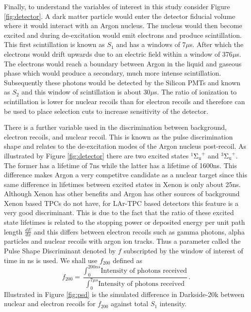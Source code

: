 \documentclass[11pt]{article} %
\begin{document}
\par Finally, to understand the variables of interest in this study consider Figure \ref{fig:detector}.
A dark matter particle would enter the detector fiducial volume where it would interact with an Argon nucleus.
The nucleus would then become excited and during de-excitation would emit electrons and produce scintillation.
This first scintillation is known as $S_1$ and has a windows of 7$\mu$s.
After which the electrons would drift upwards due to an electric field within a window of 376$\mu$s.
The electrons would reach a boundary between Argon in the liquid and gaseous phase which would produce a secondary, much more intense scintillation.
Subsequently these photons would be detected by the Silicon PMTs and known as $S_2$ and this window of scintillation is about 30$\mu$s.
The ratio of ionization to scintillation is lower for nuclear recoils than for electron recoils and therefore can be used to place selection cuts to increase sensitivity of the detector.
\\
\par There is a further variable used in the discrimination between background, electron recoils, and nuclear recoil.
This is known as the pulse discrimination shape and relates to the de-excitation modes of the Argon nucleus post-recoil.
As illustrated by Figure \ref{fig:detector} there are two excited states $^{1}\mathrm{{\Sigma_{u}}^{+}}$ and $^{3}\mathrm{{\Sigma_{u}}^{+}}$.
The former has a lifetime of 7ns while the latter has a lifetime of 1600ns.
This difference makes Argon a very competitve candidate as a nuclear target since this same difference in lifetimes between
excited states in Xenon is only about 25ns.
Although Xenon has other benefits and Argon has other sources of background Xenon based TPCs do not have, for LAr-TPC based
detectors this feature is a very good discriminant.
This is due to the fact that the ratio of these excited state lifetimes is related to the stopping power or deposited energy per unit path length
$\frac{dE}{dx}$ and this differs between electron recoils such as gamma photons, alpha particles and
nuclear recoils with argon ion tracks.
Thus a parameter called the Pulse Shape Discriminant denoted by $f$ subscripted by the window of interest of time in ns is used.
We shall use $f_{200}$ defined as
\begin{equation}
f_{200}=\frac{\int_{0}^{200ns}\text{Intensity of photons received}}{\int_{0}^{7\mu s}\text{Intensity of photons received}}.
\end{equation}
Illustrated in Figure \ref{fig:psd} is the simulated difference in Darkside-20k between nuclear and electron recoils for $f_{200}$ against total $S_1$ intensity.
\end{document}
